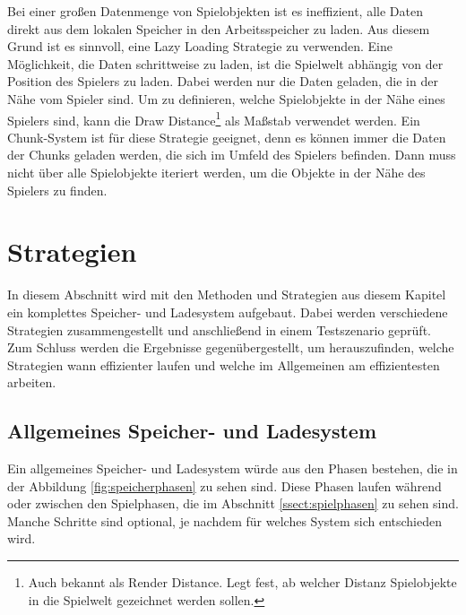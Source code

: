 Bei einer großen Datenmenge von Spielobjekten ist es ineffizient, alle Daten direkt aus dem lokalen Speicher in den Arbeitsspeicher zu laden. Aus diesem Grund ist es sinnvoll, eine Lazy Loading Strategie zu verwenden. Eine Möglichkeit, die Daten schrittweise zu laden, ist die Spielwelt abhängig von der Position des Spielers zu laden. Dabei werden nur die Daten geladen, die in der Nähe vom Spieler sind. Um zu definieren, welche Spielobjekte in der Nähe eines Spielers sind, kann die Draw Distance\footnote{Auch bekannt als Render Distance. Legt fest, ab welcher Distanz Spielobjekte in die Spielwelt gezeichnet werden sollen.\cite{nerdburglarsWhatDraw}} als Maßstab verwendet werden. Ein Chunk-System ist für diese Strategie geeignet, denn es können immer die Daten der Chunks geladen werden, die sich im Umfeld des Spielers befinden. Dann muss nicht über alle Spielobjekte iteriert werden, um die Objekte in der Nähe des Spielers zu finden.




\section{Strategien}
In diesem Abschnitt wird mit den Methoden und Strategien aus diesem Kapitel ein komplettes Speicher- und Ladesystem aufgebaut. Dabei werden verschiedene Strategien zusammengestellt und anschließend in einem Testszenario geprüft. Zum Schluss werden die Ergebnisse gegenübergestellt, um herauszufinden, welche Strategien wann effizienter laufen und welche im Allgemeinen am effizientesten arbeiten.

\subsection{Allgemeines Speicher- und Ladesystem}
Ein allgemeines Speicher- und Ladesystem würde aus den Phasen bestehen, die in der Abbildung \ref{fig:speicherphasen} zu sehen sind. Diese Phasen laufen während oder zwischen den Spielphasen, die im Abschnitt \ref{ssect:spielphasen} zu sehen sind. Manche Schritte sind optional, je nachdem für welches System sich entschieden wird.

